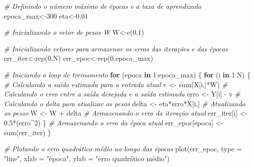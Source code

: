 \documentclass[
]{article}
\newenvironment{Shaded}{\begin{snugshade}}{\end{snugshade}}
\newcommand{\AttributeTok}[1]{\textcolor[rgb]{0.77,0.63,0.00}{#1}}
\newcommand{\CommentTok}[1]{\textcolor[rgb]{0.56,0.35,0.01}{\textit{#1}}}
\newcommand{\ControlFlowTok}[1]{\textcolor[rgb]{0.13,0.29,0.53}{\textbf{#1}}}
\newcommand{\DecValTok}[1]{\textcolor[rgb]{0.00,0.00,0.81}{#1}}
\newcommand{\FloatTok}[1]{\textcolor[rgb]{0.00,0.00,0.81}{#1}}
\newcommand{\FunctionTok}[1]{\textcolor[rgb]{0.00,0.00,0.00}{#1}}
\newcommand{\NormalTok}[1]{#1}
\newcommand{\OtherTok}[1]{\textcolor[rgb]{0.56,0.35,0.01}{#1}}
\newcommand{\SpecialCharTok}[1]{\textcolor[rgb]{0.00,0.00,0.00}{#1}}
\newcommand{\StringTok}[1]{\textcolor[rgb]{0.31,0.60,0.02}{#1}}
\begin{document}
\begin{Shaded}
\begin{Highlighting}[]
\CommentTok{\# Definindo o número máximo de épocas e a taxa de aprendizado}
\NormalTok{epoca\_max}\OtherTok{\textless{}{-}}\DecValTok{300}
\NormalTok{eta}\OtherTok{\textless{}{-}}\FloatTok{0.01}

\CommentTok{\# Inicializando o vetor de pesos W}
\NormalTok{W}\OtherTok{\textless{}{-}}\FunctionTok{c}\NormalTok{(}\DecValTok{0}\NormalTok{,}\DecValTok{1}\NormalTok{)}

\CommentTok{\# Inicializando vetores para armazenar os erros das iterações e das épocas}
\NormalTok{err\_iter}\OtherTok{\textless{}{-}}\FunctionTok{rep}\NormalTok{(}\DecValTok{0}\NormalTok{,N)}
\NormalTok{err\_epoc}\OtherTok{\textless{}{-}}\FunctionTok{rep}\NormalTok{(}\DecValTok{0}\NormalTok{,epoca\_max)}

\CommentTok{\# Iniciando o loop de treinamento}
\ControlFlowTok{for}\NormalTok{ (epoca }\ControlFlowTok{in} \DecValTok{1}\SpecialCharTok{:}\NormalTok{epoca\_max) \{}
  \ControlFlowTok{for}\NormalTok{ (i }\ControlFlowTok{in} \DecValTok{1}\SpecialCharTok{:}\NormalTok{N) \{}
    \CommentTok{\# Calculando a saída estimada para a entrada atual}
\NormalTok{    v }\OtherTok{\textless{}{-}} \FunctionTok{sum}\NormalTok{(X[i,]}\SpecialCharTok{*}\NormalTok{W)}
    \CommentTok{\# Calculando o erro entre a saída desejada e a saída estimada}
\NormalTok{    erro }\OtherTok{\textless{}{-}}\NormalTok{ Y[i] }\SpecialCharTok{{-}}\NormalTok{ v}
    \CommentTok{\# Calculando o delta para atualizar os pesos}
\NormalTok{    delta }\OtherTok{\textless{}{-}}\NormalTok{ eta}\SpecialCharTok{*}\NormalTok{erro}\SpecialCharTok{*}\NormalTok{X[i,]}
    \CommentTok{\# Atualizando os pesos}
\NormalTok{    W }\OtherTok{\textless{}{-}}\NormalTok{ W }\SpecialCharTok{+}\NormalTok{ delta}
    \CommentTok{\# Armazenando o erro da iteração atual}
\NormalTok{    err\_iter[i] }\OtherTok{\textless{}{-}} \FloatTok{0.5}\SpecialCharTok{*}\NormalTok{(erro}\SpecialCharTok{\^{}}\DecValTok{2}\NormalTok{)}
\NormalTok{  \}}
  \CommentTok{\# Armazenando o erro da época atual}
\NormalTok{  err\_epoc[epoca] }\OtherTok{\textless{}{-}} \FunctionTok{sum}\NormalTok{(err\_iter)}
\NormalTok{\}}

\CommentTok{\# Plotando o erro quadrático médio ao longo das épocas}
\FunctionTok{plot}\NormalTok{(err\_epoc, }\AttributeTok{type =} \StringTok{"line"}\NormalTok{, }\AttributeTok{xlab =} \StringTok{"época"}\NormalTok{, }\AttributeTok{ylab =} \StringTok{"erro quadrático médio"}\NormalTok{)}
\end{Highlighting}
\end{Shaded}
\end{document}
